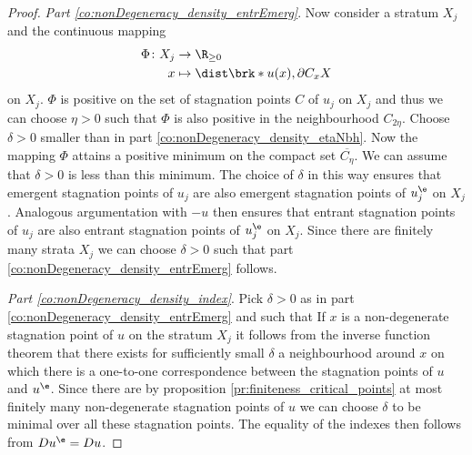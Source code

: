 \begin{proof}
  \emph{Part \ref{co:nonDegeneracy_density_entrEmerg}}.
  Now consider a stratum $X_j$ and the continuous mapping
  \begin{align*}
    \Phi\colon X_j&\to\R_{\geq0}\\
    x&\mapsto \dist\brk*{u(x),\partial C_xX}
  \end{align*}
  on $X_j$. $\Phi$ is positive on the set of stagnation points $C$ of $u_j$ on $X_j$ and thus we can choose $\eta>0$
  such that $\Phi$ is also positive in the neighbourhood $C_{2\eta}$.
  Choose $\delta>0$ smaller than in part \ref{co:nonDegeneracy_density_etaNbh}.
  Now the mapping $\Phi$ attains a positive minimum on the compact set $\overline{C_{\eta}}$.
  We can assume that $\delta>0$ is less than this minimum.
  The choice of $\delta$ in this way ensures that emergent stagnation points of $u_j$ are also emergent stagnation points of $u_j^\e$ on $X_j$.
  Analogous argumentation with $-u$ then ensures that entrant stagnation points of $u_j$ are also entrant stagnation points of $u_j^\e$ on $X_j$.
  Since there are finitely many strata $X_j$ we can choose $\delta>0$ such that part \ref{co:nonDegeneracy_density_entrEmerg} follows.

  \emph{Part \ref{co:nonDegeneracy_density_index}}.
  Pick $\delta>0$ as in part \ref{co:nonDegeneracy_density_entrEmerg} and such that
  If $x$ is a non-degenerate stagnation point of $u$ on the stratum $X_j$ it follows 
  from the inverse function theorem that there exists for sufficiently small $\delta$
  a neighbourhood around $x$ on which there is a one-to-one correspondence between the
  stagnation points of $u$ and $u^\e$.
  Since there are by proposition \ref{pr:finiteness_critical_points} at most finitely many non-degenerate stagnation points of
  $u$ we can choose $\delta$ to be minimal over all these stagnation points.
  The equality of the indexes then follows from $Du^\e=Du$.
\end{proof}



